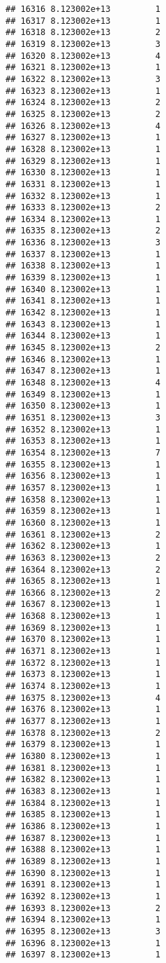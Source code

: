 \documentclass[
]{article}
\begin{document}
\begin{verbatim}
## 16316 8.123002e+13         1
## 16317 8.123002e+13         1
## 16318 8.123002e+13         2
## 16319 8.123002e+13         3
## 16320 8.123002e+13         4
## 16321 8.123002e+13         1
## 16322 8.123002e+13         3
## 16323 8.123002e+13         1
## 16324 8.123002e+13         2
## 16325 8.123002e+13         2
## 16326 8.123002e+13         4
## 16327 8.123002e+13         1
## 16328 8.123002e+13         1
## 16329 8.123002e+13         1
## 16330 8.123002e+13         1
## 16331 8.123002e+13         1
## 16332 8.123002e+13         1
## 16333 8.123002e+13         2
## 16334 8.123002e+13         1
## 16335 8.123002e+13         2
## 16336 8.123002e+13         3
## 16337 8.123002e+13         1
## 16338 8.123002e+13         1
## 16339 8.123002e+13         1
## 16340 8.123002e+13         1
## 16341 8.123002e+13         1
## 16342 8.123002e+13         1
## 16343 8.123002e+13         1
## 16344 8.123002e+13         1
## 16345 8.123002e+13         2
## 16346 8.123002e+13         1
## 16347 8.123002e+13         1
## 16348 8.123002e+13         4
## 16349 8.123002e+13         1
## 16350 8.123002e+13         1
## 16351 8.123002e+13         3
## 16352 8.123002e+13         1
## 16353 8.123002e+13         1
## 16354 8.123002e+13         7
## 16355 8.123002e+13         1
## 16356 8.123002e+13         1
## 16357 8.123002e+13         1
## 16358 8.123002e+13         1
## 16359 8.123002e+13         1
## 16360 8.123002e+13         1
## 16361 8.123002e+13         2
## 16362 8.123002e+13         1
## 16363 8.123002e+13         2
## 16364 8.123002e+13         2
## 16365 8.123002e+13         1
## 16366 8.123002e+13         2
## 16367 8.123002e+13         1
## 16368 8.123002e+13         1
## 16369 8.123002e+13         1
## 16370 8.123002e+13         1
## 16371 8.123002e+13         1
## 16372 8.123002e+13         1
## 16373 8.123002e+13         1
## 16374 8.123002e+13         1
## 16375 8.123002e+13         4
## 16376 8.123002e+13         1
## 16377 8.123002e+13         1
## 16378 8.123002e+13         2
## 16379 8.123002e+13         1
## 16380 8.123002e+13         1
## 16381 8.123002e+13         1
## 16382 8.123002e+13         1
## 16383 8.123002e+13         1
## 16384 8.123002e+13         1
## 16385 8.123002e+13         1
## 16386 8.123002e+13         1
## 16387 8.123002e+13         1
## 16388 8.123002e+13         1
## 16389 8.123002e+13         1
## 16390 8.123002e+13         1
## 16391 8.123002e+13         1
## 16392 8.123002e+13         1
## 16393 8.123002e+13         2
## 16394 8.123002e+13         1
## 16395 8.123002e+13         3
## 16396 8.123002e+13         1
## 16397 8.123002e+13         1

\end{verbatim}
\end{document}
